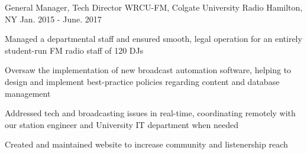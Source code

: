 \begin{cventries}
\cventry
{General Manager, Tech Director} %
{WRCU-FM, Colgate University Radio} %
{Hamilton, NY} %
{Jan. 2015 - June. 2017} %
{ %
\begin{cvitems}
\item {Managed a departmental staff and ensured smooth, legal operation for an entirely student-run FM radio staff of 120 DJs}
\item {Oversaw the implementation of new broadcast automation software, helping to design and implement best-practice policies regarding content and database management}
\item {Addressed tech and broadcasting issues in real-time, coordinating remotely with our station engineer and University IT department when needed}
\item {Created and maintained website to increase community and listenership reach}
\end{cvitems}
}

\vspace{4mm}

\end{cventries}
